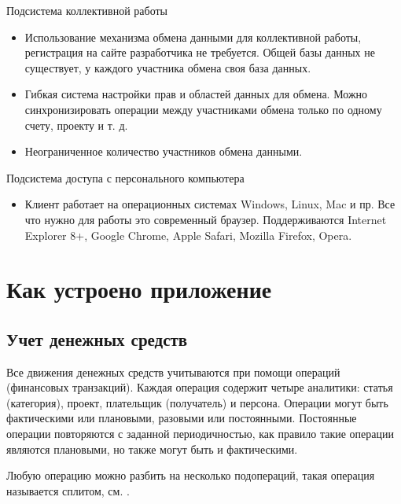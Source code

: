\documentclass[a4paper,10pt,russian]{sphinxmanual}
\begin{document}
\sphinxAtStartPar
Подсистема коллективной работы
\begin{itemize}
\item {} 
\sphinxAtStartPar
Использование механизма обмена данными для коллективной работы, регистрация на сайте разработчика не требуется. Общей базы данных не существует, у каждого участника обмена своя база данных.

\item {} 
\sphinxAtStartPar
Гибкая система настройки прав и областей данных для обмена. Можно синхронизировать операции между участниками обмена только по одному счету, проекту и т. д.

\item {} 
\sphinxAtStartPar
Неограниченное количество участников обмена данными.

\end{itemize}

\sphinxAtStartPar
Подсистема доступа с персонального компьютера
\begin{itemize}
\item {} 
\sphinxAtStartPar
Клиент работает на операционных системах Windows, Linux, Mac и пр. Все что нужно для работы \sphinxhyphen{} это современный браузер. Поддерживаются Internet Explorer 8+, Google Chrome, Apple Safari, Mozilla Firefox, Opera.

\end{itemize}

\sphinxstepscope


\chapter{Как устроено приложение}
\label{\detokenize{intro:id1}}\label{\detokenize{intro::doc}}

\section{Учет денежных средств}
\label{\detokenize{intro:id2}}
\sphinxAtStartPar
Все движения денежных средств учитываются при помощи операций (финансовых транзакций). Каждая операция содержит
четыре аналитики: статья (категория), проект, плательщик (получатель) и персона. Операции могут быть
фактическими или плановыми, разовыми или постоянными. Постоянные операции повторяются с заданной периодичностью, как правило
такие операции являются плановыми, но также могут быть и фактическими.

\sphinxAtStartPar
Любую операцию можно разбить на несколько подопераций, такая операция называется сплитом, см. {\hyperref[\detokenize{glossary:term-0}]{}}.
\end{document}
